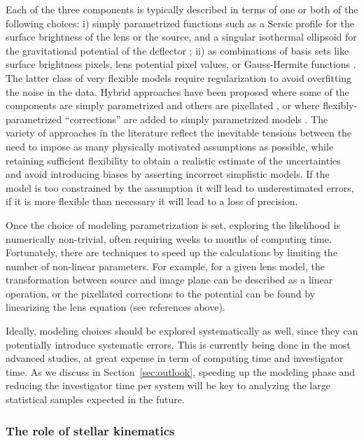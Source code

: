 Each of the three components is typically described in terms of one or
both of the following choices:
i) simply parametrized functions such as a Sersic profile
for the surface brightness of the lens or the source, and a singular
isothermal ellipsoid for the gravitational potential of the deflector
\citep[e.g.][]{Mar++07,Kee11}; ii) as combinations of basis sets like surface brightness
pixels, lens potential pixel values, or Gauss-Hermite functions
\citep[e.g.][]{Col08, BirrerEtal2015, Nig++15}. The latter class of
very flexible models require regularization to avoid overfitting the
noise in the data. Hybrid approaches have been proposed where some of
the components are simply parametrized and others are pixellated
\citep{W+D03,T+K04,Suy++06}, or where flexibly-parametrized
``corrections'' are added to simply
parametrized models \citep{Koo05,V+K09,S+H10,Suy++10,BirrerEtal2015}.
The variety of
approaches in the literature reflect the inevitable tensions between
the need to impose as many physically motivated assumptions as
possible, while retaining sufficient flexibility to obtain a realistic
estimate of the uncertainties and avoid introducing biases by
asserting incorrect simplistic models. If the model is too constrained by the
assumption it will lead to underestimated errors, if it is more
flexible than necessary it will lead to a loss of precision.

Once the choice of modeling parametrization is set, exploring the
likelihood is numerically non-trivial, often requiring weeks to months
of computing time. Fortunately, there are techniques to speed up the
calculations by limiting the number of non-linear parameters. For
example, for a given lens model, the transformation between source and
image plane can be described as a linear operation, or the pixellated
corrections to the potential can be found by linearizing the lens
equation (see references above).

Ideally, modeling choices should be explored systematically as well,
since they can potentially introduce systematic errors. This is
currently being done in the most advanced studies, at great expense in
term of computing time and investigator time. As we discuss in
Section~\ref{sec:outlook}, speeding up the modeling phase and reducing
the investigator time per system will be key to analyzing the large
statistical samples expected in the future.


\subsubsection{The role of stellar kinematics}

